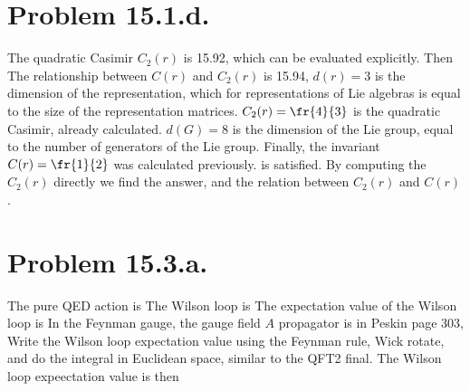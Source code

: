 \documentclass{article}
\begin{document}
\section*{Problem 15.1.d.}
The quadratic Casimir $C_2(r)$ is 15.92, which can be evaluated explicitly.
Then
The relationship between $C(r)$ and $C_2(r)$ is 15.94,
$d(r)=3$ is the dimension of the representation, which for representations of Lie algebras is equal to the size of the representation matrices. $C_2(r)=\fr{4}{3}$ is the quadratic Casimir, already calculated. $d(G)=8$ is the dimension of the Lie group, equal to the number of generators of the Lie group. Finally, the invariant $C(r)=\fr{1}{2}$ was calculated previously.  is satisfied.
By computing the $C_2(r)$ directly we find the answer, and the relation between $C_2(r)$ and $C(r)$.
\section*{Problem 15.3.a.}
The pure QED action is
The Wilson loop is
The expectation value of the Wilson loop is
In the Feynman gauge, the gauge field $A$ propagator is in Peskin page 303,
Write the Wilson loop expectation value using the Feynman rule,
Wick rotate, and do the integral in Euclidean space, similar to the QFT2 final.
The Wilson loop expeectation value is then
\end{document}
